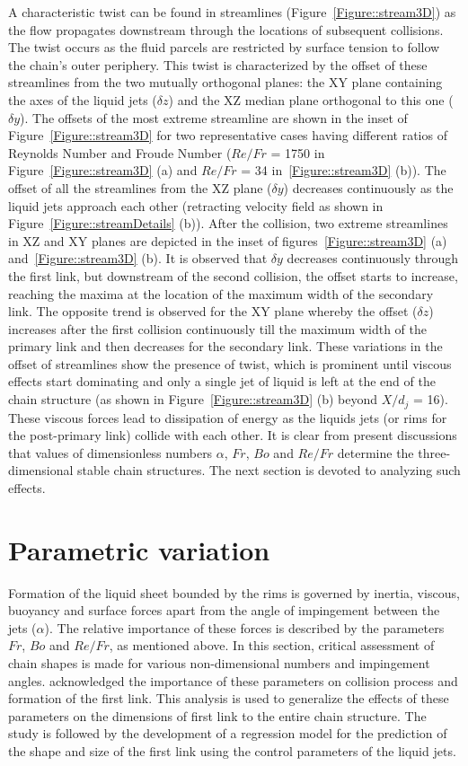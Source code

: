 A characteristic twist can be found in streamlines (Figure~\ref{Figure::stream3D}) as the flow propagates downstream through the locations of subsequent collisions. The twist occurs as the fluid parcels are restricted by surface tension to follow the chain's outer periphery. This twist is characterized by the offset of these streamlines from the two mutually orthogonal planes: the XY plane containing the axes of the liquid jets ($\delta z$) and the XZ median plane orthogonal to this one ($\delta y$). The offsets of the most extreme streamline are shown in the inset of Figure~\ref{Figure::stream3D} for two representative cases having different ratios of Reynolds Number and Froude Number ($Re/Fr$ = 1750 in Figure~\ref{Figure::stream3D} (a) and $Re/Fr$ = 34 in~\ref{Figure::stream3D} (b)). The offset of all the streamlines from the XZ plane ($\delta y$) decreases continuously as the liquid jets approach each other (retracting velocity field as shown in Figure~\ref{Figure::streamDetails} (b)). After the collision, two extreme streamlines in XZ and XY planes are depicted in the inset of figures~\ref{Figure::stream3D} (a) and~\ref{Figure::stream3D} (b). It is observed that $\delta y$ decreases continuously through the first link, but downstream of the second collision, the offset starts to increase, reaching the maxima at the location of the maximum width of the secondary link. The opposite trend is observed for the XY plane whereby the offset ($\delta z$) increases after the first collision continuously till the maximum width of the primary link and then decreases for the secondary link. These variations in the offset of streamlines show the presence of twist, which is prominent until viscous effects start dominating and only a single jet of liquid is left at the end of the chain structure (as shown in Figure~\ref{Figure::stream3D} (b) beyond $X/d_j$ = 16). These viscous forces lead to dissipation of energy as the liquids jets (or rims for the post-primary link) collide with each other. It is clear from present discussions that values of dimensionless numbers $\alpha$, $Fr$, $Bo$ and $Re/Fr$ determine the three-dimensional stable chain structures. The next section is devoted to analyzing such effects.
\section{Parametric variation}
Formation of the liquid sheet bounded by the rims is governed by inertia, viscous, buoyancy and surface forces apart from the angle of impingement between the jets ($\alpha$). The relative importance of these forces is described by the parameters $Fr$, $Bo$ and $Re/Fr$, as mentioned above. In this section, critical assessment of chain shapes is made for various non-dimensional numbers and impingement angles.  \citet{yang2014liquid} acknowledged the importance of these parameters on collision process and formation of the first link. This analysis is used to generalize the effects of these parameters on the dimensions of first link to the entire chain structure. The study is followed by the development of a regression model for the prediction of the shape and size of the first link using the control parameters of the liquid jets. 
